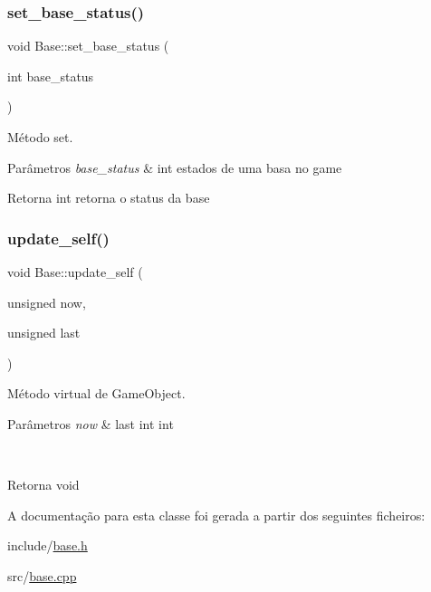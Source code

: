 \subsubsection{\texorpdfstring{set\+\_\+base\+\_\+status()}{set\_base\_status()}}
{\footnotesize\ttfamily void Base\+::set\+\_\+base\+\_\+status (\begin{DoxyParamCaption}\item[{int}]{base\+\_\+status }\end{DoxyParamCaption})}



Método set. 


\begin{DoxyParams}{Parâmetros}
{\em base\+\_\+status} & int estados de uma basa no game \\
\hline
\end{DoxyParams}
\begin{DoxyReturn}{Retorna}
int retorna o status da base 
\end{DoxyReturn}
\mbox{\label{classBase_a04c92d862951b17a9f96ff43c738c2f9}} 
\subsubsection{\texorpdfstring{update\+\_\+self()}{update\_self()}}
{\footnotesize\ttfamily void Base\+::update\+\_\+self (\begin{DoxyParamCaption}\item[{unsigned}]{now,  }\item[{unsigned}]{last }\end{DoxyParamCaption})\hspace{0.3cm}{\ttfamily [protected]}}



Método virtual de Game\+Object. 


\begin{DoxyParams}{Parâmetros}
{\em now} & last int int 

 \\
\hline
\end{DoxyParams}
\begin{DoxyReturn}{Retorna}
void 
\end{DoxyReturn}


A documentação para esta classe foi gerada a partir dos seguintes ficheiros\+:\begin{DoxyCompactItemize}
\item 
include/\mbox{\hyperlink{base_8h}{base.\+h}}\item 
src/\mbox{\hyperlink{base_8cpp}{base.\+cpp}}\end{DoxyCompactItemize}
